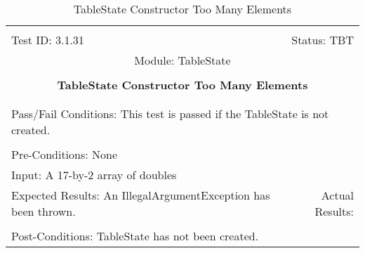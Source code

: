 \documentclass[titlepage]{article}
\begin{document}
\begin{center}%
\begin{table}
\begin{tabular}{|l r|}\hline&\\[-2mm]
	Test ID: 3.1.31	&Status: TBT\\[-3mm]
	\multicolumn{2}{|c|}{Module: TableState}\\&\\
	\multicolumn{2}{|c|}{\textbf{\large{TableState Constructor Too Many Elements}}}\\&\\\hline&\\[-3mm]
	\multicolumn{2}{|p{\textwidth}|}{Pass/Fail Conditions: This test is passed if the TableState is not created.}\\[1mm]\hline&\\[-3mm]
	\multicolumn{2}{|p{\textwidth}|}{Pre-Conditions: None}\\[4mm]
	\multicolumn{2}{|p{\textwidth}|}{Input: A 17-by-2 array of doubles}\\[2mm]\hline
	\multicolumn{1}{|p{0.49\textwidth}}{Expected Results: An IllegalArgumentException has been thrown.}	&\multicolumn{1}{|p{0.45\textwidth}|}{Actual Results: }\\\hline&\\[-3mm]
	\multicolumn{2}{|p{\textwidth}|}{Post-Conditions: TableState has not been created.}\\\hline
\end{tabular}
\caption{TableState Constructor Too Many Elements}
\end{table}
\end{center}
\end{document}
